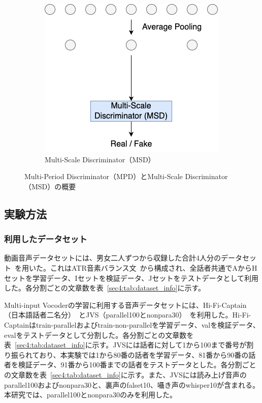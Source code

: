 \documentclass[12pt]{jarticle}
\numberwithin{equation}{section}    %
\numberwithin{figure}{section}      %
\numberwithin{table}{section}      %
\begin{document}
\begin{figure}[bt]
\begin{subfigure}{0.45\textwidth}
        \includegraphics[width=\linewidth]{./figure/sec4/model/msd.png}
        \caption{Multi-Scale Discriminator（MSD）}
        \label{sec4:fig:multi-input_vocoder_msd}
    \end{subfigure}
    \caption{Multi-Period Discriminator（MPD）とMulti-Scale Discriminator（MSD）の概要}
    \label{sec4:fig:multi-input_vocoder_mpd_msd}
\end{figure}

\subsection{実験方法}
\subsubsection{利用したデータセット}
動画音声データセットには、男女二人ずつから収録した合計4人分のデータセット~\cite{taguchi,esaki}を用いた。これはATR音素バランス文~\cite{atr}から構成され、全話者共通でAからHセットを学習データ、Iセットを検証データ、Jセットをテストデータとして利用した。各分割ごとの文章数を表~\ref{sec4:tab:dataset_info}に示す。

Multi-input Vocoderの学習に利用する音声データセットには、Hi-Fi-Captain（日本語話者二名分）~\cite{okamoto2023hi}とJVS（parallel100とnonpara30）~\cite{takamichi2019jvs}を利用した。Hi-Fi-Captainはtrain-parallelおよびtrain-non-parallelを学習データ、valを検証データ、evalをテストデータとして分割した。各分割ごとの文章数を表~\ref{sec4:tab:dataset_info}に示す。JVSには話者に対して1から100まで番号が割り振られており、本実験では1から80番の話者を学習データ、81番から90番の話者を検証データ、91番から100番までの話者をテストデータとした。各分割ごとの文章数を表~\ref{sec4:tab:dataset_info}に示す。また、JVSには読み上げ音声のparallel100およびnonpara30と、裏声のfalset10、囁き声のwhisper10が含まれる。本研究では、parallel100とnonpara30のみを利用した。
\end{document}
